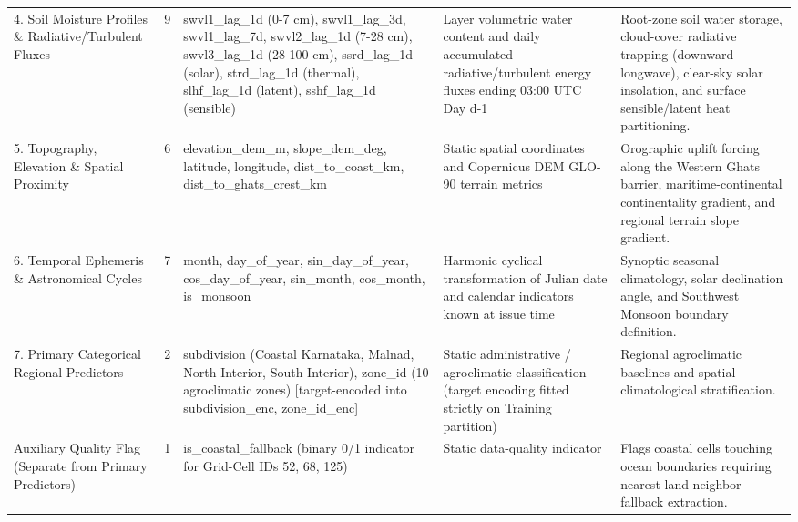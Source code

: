 \documentclass[pdflatex,sn-mathphys,Numbered]{sn-jnl}
\begin{document}
\begin{table}[htbp]
{\begin{tabular}{p{3.5cm}cp{5.5cm}p{4cm}p{5.5cm}}
4. Soil Moisture Profiles \& Radiative/Turbulent Fluxes & 9 & swvl1\_lag\_1d (0-7 cm), swvl1\_lag\_3d, swvl1\_lag\_7d, swvl2\_lag\_1d (7-28 cm), swvl3\_lag\_1d (28-100 cm), ssrd\_lag\_1d (solar), strd\_lag\_1d (thermal), slhf\_lag\_1d (latent), sshf\_lag\_1d (sensible) & Layer volumetric water content and daily accumulated radiative/turbulent energy fluxes ending 03:00 UTC Day d-1 & Root-zone soil water storage, cloud-cover radiative trapping (downward longwave), clear-sky solar insolation, and surface sensible/latent heat partitioning. \\
5. Topography, Elevation \& Spatial Proximity & 6 & elevation\_dem\_m, slope\_dem\_deg, latitude, longitude, dist\_to\_coast\_km, dist\_to\_ghats\_crest\_km & Static spatial coordinates and Copernicus DEM GLO-90 terrain metrics & Orographic uplift forcing along the Western Ghats barrier, maritime-continental continentality gradient, and regional terrain slope gradient. \\
6. Temporal Ephemeris \& Astronomical Cycles & 7 & month, day\_of\_year, sin\_day\_of\_year, cos\_day\_of\_year, sin\_month, cos\_month, is\_monsoon & Harmonic cyclical transformation of Julian date and calendar indicators known at issue time & Synoptic seasonal climatology, solar declination angle, and Southwest Monsoon boundary definition. \\
7. Primary Categorical Regional Predictors & 2 & subdivision (Coastal Karnataka, Malnad, North Interior, South Interior), zone\_id (10 agroclimatic zones) [target-encoded into subdivision\_enc, zone\_id\_enc] & Static administrative / agroclimatic classification (target encoding fitted strictly on Training partition) & Regional agroclimatic baselines and spatial climatological stratification. \\
Auxiliary Quality Flag (Separate from Primary Predictors) & 1 & is\_coastal\_fallback (binary 0/1 indicator for Grid-Cell IDs 52, 68, 125) & Static data-quality indicator & Flags coastal cells touching ocean boundaries requiring nearest-land neighbor fallback extraction. \\
\bottomrule
\end{tabular}
}
\end{table}
\end{document}
